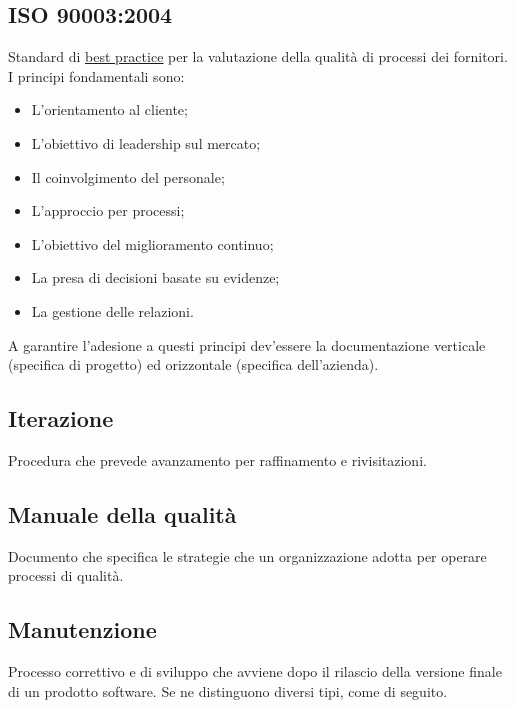 	\subsection{ISO 90003:2004}
	\label{sec:iso90003}
	Standard di \underline{\hyperref[sec:bestpractice]{best practice}} per la valutazione della qualità di processi dei fornitori. I principi fondamentali sono:
	\begin{itemize}  
	\item L'orientamento al cliente;
	\item L'obiettivo di leadership sul mercato;
	\item Il coinvolgimento del personale;
	\item L'approccio per processi;
	\item L'obiettivo del miglioramento continuo;
	\item La presa di decisioni basate su evidenze;
	\item La gestione delle relazioni.
	\end{itemize}	
	A garantire l'adesione a questi principi dev'essere la documentazione verticale (specifica di progetto) ed orizzontale (specifica dell'azienda).	
	
	\subsection{Iterazione}
	\label{sec:iterazione}
	Procedura che prevede avanzamento per raffinamento e rivisitazioni.\newpage

	\subsection{Manuale della qualità}
	\label{sec:manualequalita}
	Documento che specifica le strategie che un organizzazione adotta per operare processi di qualità.
	
	
	\subsection{Manutenzione}
	\label{sec:manutenzione}
	Processo correttivo e di sviluppo che avviene dopo il rilascio della versione finale di un prodotto software. Se ne distinguono diversi tipi, come di seguito.
		
